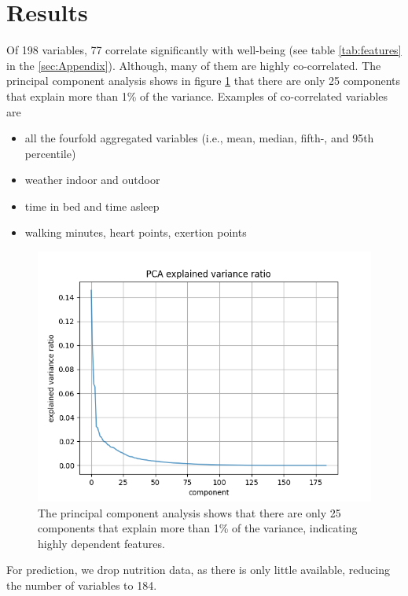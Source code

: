 \documentclass[conference]{IEEEtran}
\begin{document}
\section{Results}
Of 198 variables, 77 correlate significantly with well-being (see table \ref{tab:features} in the \ref{sec:Appendix}). Although, many of them are highly co-correlated. The principal component analysis shows in figure \ref{fig:pca} that there are only 25 components that explain more than 1\% of the variance. Examples of co-correlated variables are
\begin{itemize}
    \item all the fourfold aggregated variables (i.e., mean, median, fifth-, and 95th percentile)
    \item weather indoor and outdoor
    \item time in bed and time asleep
    \item walking minutes, heart points, exertion points
\end{itemize}

\begin{figure}[htbp]
\begin{center}
\includegraphics[width=1\linewidth]{figs/pca_explained_variance_ratio.png}
\caption{The principal component analysis shows that there are only 25 components that explain more than 1\% of the variance, indicating highly dependent features.}
\label{fig:pca}
\end{center}
\end{figure}

For prediction, we drop nutrition data, as there is only little available, reducing the number of variables to 184.
\end{document}
